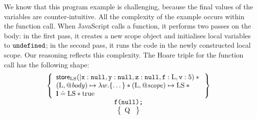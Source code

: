 \documentclass{article}
\begin{document}
We know that this program example is challenging, because %
the final values of the variables are counter-intuitive.  All the complexity of
the example occurs within the function call.  When JavaScript calls a function,
it performs two passes on the body: in the first pass, it creates a new scope
object and initialises local variables to $\mbox{\texttt{{\upshape undefined}}}$; in the second pass,
it runs the code in the newly constructed local scope.
Our reasoning reflects this complexity. 
The Hoare triple for the function call  has the following shape:
\[\begin{array}{c}
        \left\{\begin{array}{l}
             
                \store_{\V{LS}}(|\js{x}:\nil,\js{y}:\nil,\js{z}:\nil,\js{f}:\V{L},\js{v}:5) \sep {}\\
                (\V{L},\bodyp)\pointsto \lambda w.\{\dots\}\sep
                (\V{L},\fscopep)\pointsto \V{LS}  \sep{}\\
                \ls\doteq\V{LS}\sep\true
        \end{array}\right\}\\
\js{f(}\nil\js{);}\\
        \left\{\begin{array}{c}

                \text{Q }
        \end{array}\right\}%
\end{array}\]
\end{document}
